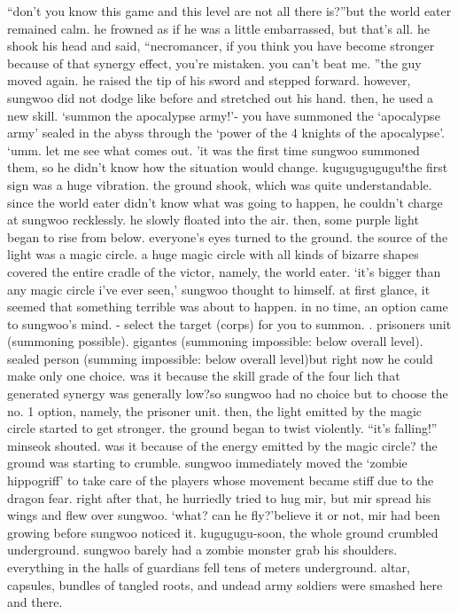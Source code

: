 “don’t you know this game and this level are not all there is?”but the world eater remained calm.
 he frowned as if he was a little embarrassed, but that’s all.
he shook his head and said, “necromancer, if you think you have become stronger because of that synergy effect, you’re mistaken.
 you can’t beat me.
”the guy moved again.
 he raised the tip of his sword and stepped forward.
 however, sungwoo did not dodge like before and stretched out his hand.
then, he used a new skill.
‘summon the apocalypse army!’- you have summoned the ‘apocalypse army’ sealed in the abyss through the ‘power of the 4 knights of the apocalypse’.
‘umm.
 let me see what comes out.
’it was the first time sungwoo summoned them, so he didn’t know how the situation would change.
kugugugugugu!the first sign was a huge vibration.
 the ground shook, which was quite understandable.
since the world eater didn’t know what was going to happen, he couldn’t charge at sungwoo recklessly.
 he slowly floated into the air.
 then, some purple light began to rise from below.
 everyone’s eyes turned to the ground.
the source of the light was a magic circle.
 a huge magic circle with all kinds of bizarre shapes covered the entire cradle of the victor, namely, the world eater.
‘it’s bigger than any magic circle i’ve ever seen,’ sungwoo thought to himself.
at first glance, it seemed that something terrible was about to happen.
 in no time, an option came to sungwoo’s mind.
- select the target (corps) for you to summon.
.
 prisoners unit (summoning possible).
 gigantes (summoning impossible: below overall level).
 sealed person (summing impossible: below overall level)but right now he could make only one choice.
 was it because the skill grade of the four lich that generated synergy was generally low?so sungwoo had no choice but to choose the no.
 1 option, namely, the prisoner unit.
 then, the light emitted by the magic circle started to get stronger.
the ground began to twist violently.
“it’s falling!” minseok shouted.
was it because of the energy emitted by the magic circle? the ground was starting to crumble.
sungwoo immediately moved the ‘zombie hippogriff’ to take care of the players whose movement became stiff due to the dragon fear.
right after that, he hurriedly tried to hug mir, but mir spread his wings and flew over sungwoo.
‘what? can he fly?’believe it or not, mir had been growing before sungwoo noticed it.
kugugugu-soon, the whole ground crumbled underground.
 sungwoo barely had a zombie monster grab his shoulders.
 everything in the halls of guardians fell tens of meters underground.
 altar, capsules, bundles of tangled roots, and undead army soldiers were smashed here and there.


